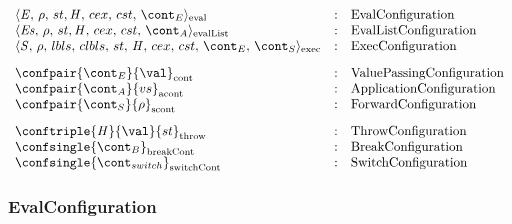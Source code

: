 \documentclass{article}
\begin{document}
\newcommand{\breakconf}[1]{\confsingle{#1}_{\mathrm{breakCont}}}
\newcommand{\switchconf}[1]{\confsingle{#1}_{\mathrm{switchCont}}}
\newcommand{\contconf}[2]{\confpair{#1}{#2}_{\mathrm{cont}}}
\newcommand{\scontconf}[2]{\confpair{#1}{#2}_{\mathrm{scont}}}
\newcommand{\acontconf}[2]{\confpair{#1}{#2}_{\mathrm{acont}}}
\newcommand{\throwconf}[3]{\conftriple{#1}{#2}{#3}_{\mathrm{throw}}}
\newcommand{\evallistconf}[6]{\langle{#1},\,{#2},\,{#3},\handler,\,{#4},\,{#5},\,{#6}\rangle_{\mathrm{evalList}}}
\newcommand{\evalconf}[6]{\langle{#1},\,{#2},\,{#3},\handler,\,{#4},\,{#5},\,{#6}\rangle_{\mathrm{eval}}}
\newcommand{\execconf}[9]{\langle{#1},\,{#2},\,{#3},\,{#4},\,\strace,\,{#5},\,{#6},\,{#7},\,{#8},\,{#9}\rangle_{\mathrm{exec}}}

\newcommand{\cesktrans}[2]{{#1} & \Rightarrow & {#2}}

\[
  \begin{array}{lcl}
	\evalconf{\expr}{\env}{st}{cex}{cst}{\econt} & : &
	\textrm{EvalConfiguration}\\

	\evallistconf{\exprs}{\env}{st}{cex}{cst}{\acont} & : &
	\textrm{EvalListConfiguration}\\

	\execconf{\stmt}{\env}{\lbls}{\clbls}{\handler}{\cex}{\cstrace}{\econt}{\scont}  & : &
	\textrm{ExecConfiguration}\\[3mm]

	\contconf{\econt}{\val} & : &
	\textrm{ValuePassingConfiguration}\\

	\acontconf{\acont}{\vals} & : &
	\textrm{ApplicationConfiguration}\\

	\scontconf{\scont}{\env} & : &
	\textrm{ForwardConfiguration}\\[3mm]

	\throwconf{\handler}{\val}{\strace} & : &
	\textrm{ThrowConfiguration}\\

	\breakconf{\bcont} & : &
	\textrm{BreakConfiguration}\\

	\switchconf{\switchcont} & : &
	\textrm{SwitchConfiguration}\\

  \end{array}
\]

\subsubsection{EvalConfiguration}
\label{subsubsec:evalconfig}
\end{document}
